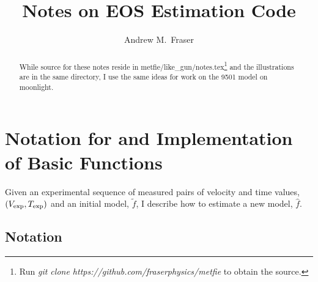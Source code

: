 \documentclass[11pt]{article}
\title{Notes on EOS Estimation Code}
\author{Andrew M.\ Fraser}
\newcommand{\fnom}{\tilde f}
\newcommand{\fhat}{\hat f}
\newcommand\vexp{V_{\rm{exp}}}
\newcommand\texp{T_{\rm{exp}}}
\begin{document}
\maketitle
\begin{abstract}
  While source for these notes reside in
  metfie/like\_gun/notes.tex\footnote{Run \emph{git clone
      https://github.com/fraserphysics/metfie} to obtain the source.}
    and the illustrations are in the same directory, I use the same
    ideas for work on the 9501 model on moonlight.
\end{abstract}

\section{Notation for and Implementation of Basic Functions}
\label{sec:basic}

Given an experimental sequence of measured pairs of velocity and time
values, $(\vexp, \texp)$ and an initial model, $\fnom$, I describe how
to estimate a new model, $\fhat$.

\subsection{Notation}
\label{sec:basic_notation}
\end{document}
